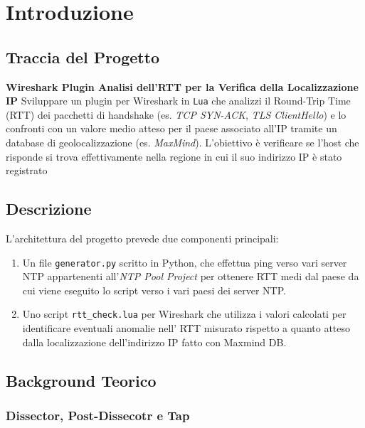 \chapter{Introduzione}

\section{Traccia del Progetto}

\textbf{Wireshark Plugin Analisi dell'RTT per la Verifica della Localizzazione IP}
\newline\newline
Sviluppare un plugin per Wireshark in \texttt{Lua} che analizzi il Round-Trip Time (RTT) dei pacchetti di handshake (es. \textit{TCP SYN-ACK}, \textit{TLS ClientHello}) e lo confronti con un valore medio atteso per il paese associato all'IP tramite un database di geolocalizzazione (es. \textit{MaxMind}).
L'obiettivo è verificare se l'host che risponde si trova effettivamente nella regione in cui il suo indirizzo IP è stato registrato

\section{Descrizione}

L'architettura del progetto prevede due componenti principali:

\begin{enumerate}

  \item Un file \texttt{generator.py} scritto in Python, che effettua ping verso vari server NTP appartenenti all'\textit{NTP Pool Project} per ottenere RTT medi dal paese da cui viene eseguito lo script verso i vari paesi dei server NTP.
  \item Uno script \texttt{rtt\_check.lua} per Wireshark che utilizza i valori calcolati per identificare eventuali anomalie nell' RTT misurato rispetto a quanto atteso dalla localizzazione dell'indirizzo IP fatto con Maxmind DB.
  
\end{enumerate}

\section{Background Teorico}

\subsection{Dissector, Post-Dissecotr e Tap}


